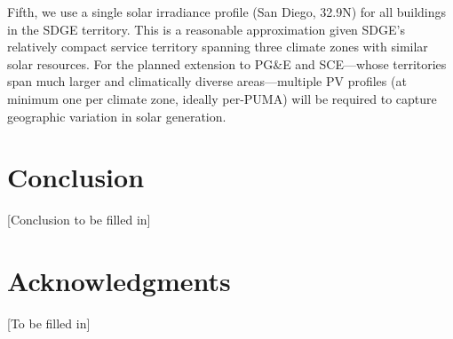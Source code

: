 \documentclass[12pt]{article}
\begin{document}
Fifth, we use a single solar irradiance profile (San Diego, 32.9\textdegree N) for all buildings in the SDGE territory. This is a reasonable approximation given SDGE's relatively compact service territory spanning three climate zones with similar solar resources. For the planned extension to PG\&E and SCE---whose territories span much larger and climatically diverse areas---multiple PV profiles (at minimum one per climate zone, ideally per-PUMA) will be required to capture geographic variation in solar generation.

\section{Conclusion}
[Conclusion to be filled in]

\section{Acknowledgments}
[To be filled in]



\end{document}
